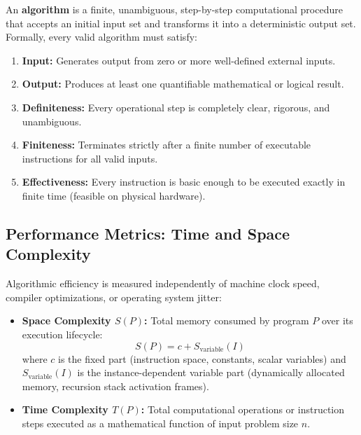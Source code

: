 \documentclass[12pt,a4paper]{article}
\begin{document}
\begin{tcolorbox}[defbox, title={\textbf{Definition: Algorithm Criteria and Formal Characteristics}}]
An \textbf{algorithm} is a finite, unambiguous, step-by-step computational procedure that accepts an initial input set and transforms it into a deterministic output set. Formally, every valid algorithm must satisfy:
\begin{enumerate}[leftmargin=*, nosep]
  \item \textbf{Input:} Generates output from zero or more well-defined external inputs.
  \item \textbf{Output:} Produces at least one quantifiable mathematical or logical result.
  \item \textbf{Definiteness:} Every operational step is completely clear, rigorous, and unambiguous.
  \item \textbf{Finiteness:} Terminates strictly after a finite number of executable instructions for all valid inputs.
  \item \textbf{Effectiveness:} Every instruction is basic enough to be executed exactly in finite time (feasible on physical hardware).
\end{enumerate}
\end{tcolorbox}

\subsection{Performance Metrics: Time and Space Complexity}
Algorithmic efficiency is measured independently of machine clock speed, compiler optimizations, or operating system jitter:
\begin{itemize}[leftmargin=*, itemsep=4pt]
  \item \textbf{Space Complexity $S(P)$:} Total memory consumed by program $P$ over its execution lifecycle:
  \begin{equation}
    S(P) = c + S_{\text{variable}}(I)
  \end{equation}
  where $c$ is the fixed part (instruction space, constants, scalar variables) and $S_{\text{variable}}(I)$ is the instance-dependent variable part (dynamically allocated memory, recursion stack activation frames).
  \item \textbf{Time Complexity $T(P)$:} Total computational operations or instruction steps executed as a mathematical function of input problem size $n$.
\end{itemize}
\end{document}
